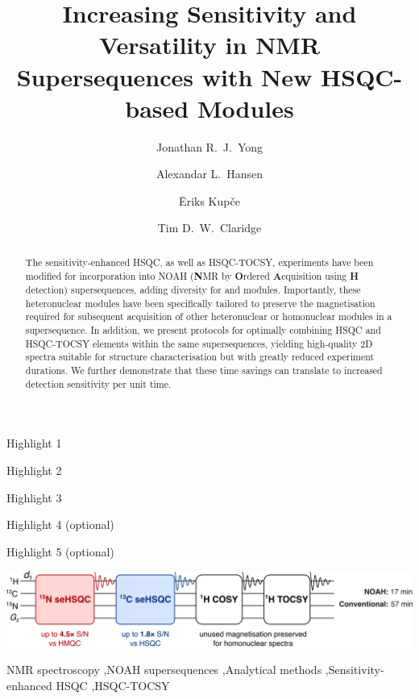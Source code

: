 \documentclass[final,twocolumn]{elsarticle}
\newcommand*{\carbon}{\ce{^{13}C}}
\newcommand*{\nitrogen}{\ce{^{15}N}}
\begin{document}
    \begin{frontmatter}
        \title{Increasing Sensitivity and Versatility in NMR Supersequences with New HSQC-based Modules}

        \address[oxford]{Chemistry Research Laboratory, Department of Chemistry, University of Oxford, Mansfield Road, Oxford, OX1 3TA, U.K.}
        \address[ohio]{Campus Chemical Instrument Center, The Ohio State University, 460 W.\ 12th Avenue, Columbus, OH, 43210 U.S.}
        \address[bruker]{Bruker UK Ltd., Banner Lane, Coventry, CV4 9GH, U.K.}

        \author[oxford]{Jonathan R.\ J.\ Yong}
        \author[ohio]{Alexandar L.\ Hansen}
        \author[bruker]{{\=E}riks Kup{\v{c}}e}
        \author[oxford]{Tim D.\ W.\ Claridge}
        \begin{abstract}
            The sensitivity-enhanced HSQC, as well as HSQC-TOCSY, experiments have been modified for incorporation into NOAH (\textbf{N}MR by \textbf{O}rdered \textbf{A}cquisition using \textbf{H} detection) supersequences, adding diversity for \carbon{} and \nitrogen{} modules.
            Importantly, these heteronuclear modules have been specifically tailored to preserve the magnetisation required for subsequent acquisition of other heteronuclear or homonuclear modules in a supersequence.
            In addition, we present protocols for optimally combining HSQC and HSQC-TOCSY elements within the same supersequences, yielding high-quality 2D spectra suitable for structure characterisation but with greatly reduced experiment durations.
            We further demonstrate that these time savings can translate to increased detection sensitivity per unit time.
        \end{abstract}
        \begin{highlights}
            \item Highlight 1
            \item Highlight 2
            \item Highlight 3
            \item Highlight 4 (optional)
            \item Highlight 5 (optional)
        \end{highlights}
        \begin{graphicalabstract}
            \includegraphics{TOC.png}
        \end{graphicalabstract}
        \begin{keyword}
            NMR spectroscopy \sep NOAH supersequences \sep Analytical methods \sep Sensitivity-enhanced HSQC \sep HSQC-TOCSY
        \end{keyword}
    \end{frontmatter}
\end{document}
